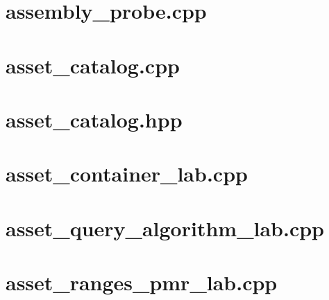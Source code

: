 \documentclass[11pt,twoside,openany]{book}
\begin{document}
\section*{assembly\_probe.cpp}
\hypertarget{source-file-04abded74b7e03edc5dcf870}{}
\label{attachmentstart:source-file-04abded74b7e03edc5dcf870}
\section*{asset\_catalog.cpp}
\hypertarget{source-file-0529c78555b675a2ae111228}{}
\label{attachmentstart:source-file-0529c78555b675a2ae111228}
\section*{asset\_catalog.hpp}
\hypertarget{source-file-e829cf731b17419e282775cf}{}
\label{attachmentstart:source-file-e829cf731b17419e282775cf}
\section*{asset\_container\_lab.cpp}
\hypertarget{source-file-c479bd493444d093f6c34898}{}
\label{attachmentstart:source-file-c479bd493444d093f6c34898}
\section*{asset\_query\_algorithm\_lab.cpp}
\hypertarget{source-file-a1c76c44bc377537c732f5c4}{}
\label{attachmentstart:source-file-a1c76c44bc377537c732f5c4}
\section*{asset\_ranges\_pmr\_lab.cpp}
\hypertarget{source-file-9e5ff4ba88e6efabc938832a}{}
\label{attachmentstart:source-file-9e5ff4ba88e6efabc938832a}
\end{document}
